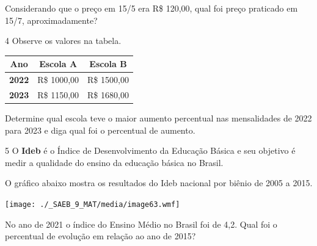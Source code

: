 \begin{escolha}
Considerando que o preço em 15/5 era R\$ 120,00, qual foi preço praticado
em 15/7, aproximadamente?

\begin{boxmedio}
\end{boxmedio}

\num{4} Observe os valores na tabela. 

\begin{center}
\begin{tabular}{|lll|}
\hline
\multicolumn{1}{|c}{\textbf{Ano}} & \multicolumn{1}{c}{\textbf{Escola A}} & \multicolumn{1}{c|}{\textbf{Escola B}} \\ \hline
\textbf{2022} & R\$ 1000,00 & R\$ 1500,00 \\ \hline
\textbf{2023} & R\$ 1150,00 & R\$ 1680,00 \\ \hline
\end{tabular}
\end{center}

Determine qual escola teve o maior aumento percentual nas mensalidades
de 2022 para 2023 e diga qual foi o percentual de aumento.

\begin{boxmedio}
\end{boxmedio}

\num{5} O \textbf{Ideb} é o Índice de Desenvolvimento da
Educação Básica e seu objetivo é medir a qualidade do ensino da
educação básica no Brasil.

O gráfico abaixo mostra os resultados do Ideb nacional por biênio de
2005 a 2015.

\texttt{[image: ./\_SAEB\_9\_MAT/media/image63.wmf]}

No ano de 2021 o índice do Ensino Médio no Brasil foi de 4,2. Qual foi 
o percentual de evolução em relação ao ano de 2015?

\begin{boxpeq}
\end{boxpeq}


\end{escolha}

